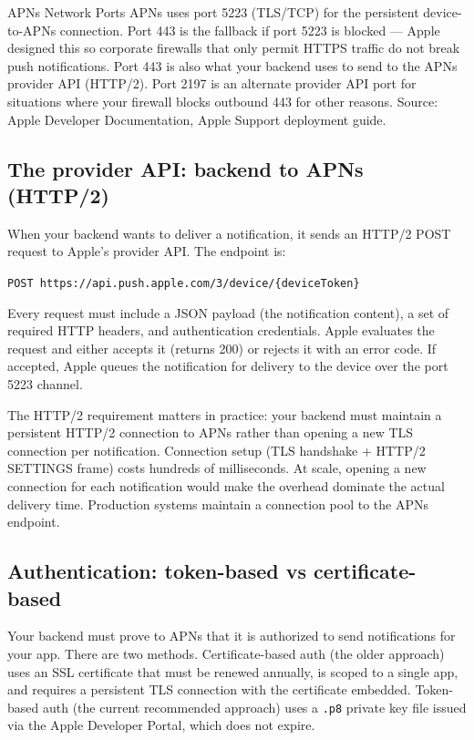 \documentclass[11pt,a4paper]{article}
\begin{document}
\begin{industrybox}{APNs Network Ports}
APNs uses port 5223 (TLS/TCP) for the persistent device-to-APNs connection. Port 443 is the fallback if port 5223 is blocked --- Apple designed this so corporate firewalls that only permit HTTPS traffic do not break push notifications. Port 443 is also what your backend uses to send to the APNs provider API (HTTP/2). Port 2197 is an alternate provider API port for situations where your firewall blocks outbound 443 for other reasons. Source: Apple Developer Documentation, Apple Support deployment guide.
\end{industrybox}

\subsection{The provider API: backend to APNs (HTTP/2)}

When your backend wants to deliver a notification, it sends an HTTP/2 POST request to Apple's provider API. The endpoint is:

\begin{center}
\texttt{POST https://api.push.apple.com/3/device/\{deviceToken\}}
\end{center}

Every request must include a JSON payload (the notification content), a set of required HTTP headers, and authentication credentials. Apple evaluates the request and either accepts it (returns 200) or rejects it with an error code. If accepted, Apple queues the notification for delivery to the device over the port 5223 channel.

The HTTP/2 requirement matters in practice: your backend must maintain a persistent HTTP/2 connection to APNs rather than opening a new TLS connection per notification. Connection setup (TLS handshake + HTTP/2 SETTINGS frame) costs hundreds of milliseconds. At scale, opening a new connection for each notification would make the overhead dominate the actual delivery time. Production systems maintain a connection pool to the APNs endpoint.

\subsection{Authentication: token-based vs certificate-based}

Your backend must prove to APNs that it is authorized to send notifications for your app. There are two methods. Certificate-based auth (the older approach) uses an SSL certificate that must be renewed annually, is scoped to a single app, and requires a persistent TLS connection with the certificate embedded. Token-based auth (the current recommended approach) uses a \texttt{.p8} private key file issued via the Apple Developer Portal, which does not expire.
\end{document}
